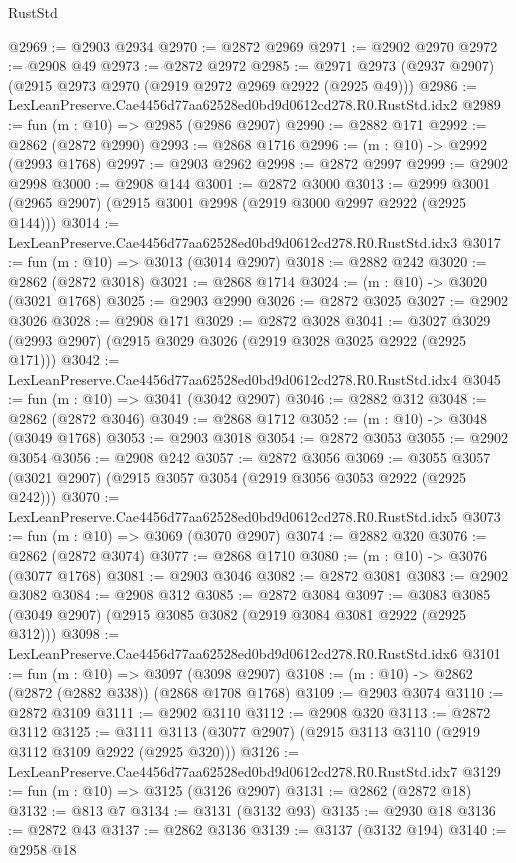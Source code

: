 \begin{lexlean}{RustStd}
\begin{coremodule}
@2969 := @2903 @2934
@2970 := @2872 @2969
@2971 := @2902 @2970
@2972 := @2908 @49
@2973 := @2872 @2972
@2985 := @2971 @2973 (@2937 @2907) (@2915 @2973 @2970 (@2919 @2972 @2969 @2922 (@2925 @49)))
@2986 := LexLeanPreserve.Cae4456d77aa62528ed0bd9d0612cd278.R0.RustStd.idx2
@2989 := fun (m : @10) => @2985 (@2986 @2907)
@2990 := @2882 @171
@2992 := @2862 (@2872 @2990)
@2993 := @2868 @1716
@2996 := (m : @10) -> @2992 (@2993 @1768)
@2997 := @2903 @2962
@2998 := @2872 @2997
@2999 := @2902 @2998
@3000 := @2908 @144
@3001 := @2872 @3000
@3013 := @2999 @3001 (@2965 @2907) (@2915 @3001 @2998 (@2919 @3000 @2997 @2922 (@2925 @144)))
@3014 := LexLeanPreserve.Cae4456d77aa62528ed0bd9d0612cd278.R0.RustStd.idx3
@3017 := fun (m : @10) => @3013 (@3014 @2907)
@3018 := @2882 @242
@3020 := @2862 (@2872 @3018)
@3021 := @2868 @1714
@3024 := (m : @10) -> @3020 (@3021 @1768)
@3025 := @2903 @2990
@3026 := @2872 @3025
@3027 := @2902 @3026
@3028 := @2908 @171
@3029 := @2872 @3028
@3041 := @3027 @3029 (@2993 @2907) (@2915 @3029 @3026 (@2919 @3028 @3025 @2922 (@2925 @171)))
@3042 := LexLeanPreserve.Cae4456d77aa62528ed0bd9d0612cd278.R0.RustStd.idx4
@3045 := fun (m : @10) => @3041 (@3042 @2907)
@3046 := @2882 @312
@3048 := @2862 (@2872 @3046)
@3049 := @2868 @1712
@3052 := (m : @10) -> @3048 (@3049 @1768)
@3053 := @2903 @3018
@3054 := @2872 @3053
@3055 := @2902 @3054
@3056 := @2908 @242
@3057 := @2872 @3056
@3069 := @3055 @3057 (@3021 @2907) (@2915 @3057 @3054 (@2919 @3056 @3053 @2922 (@2925 @242)))
@3070 := LexLeanPreserve.Cae4456d77aa62528ed0bd9d0612cd278.R0.RustStd.idx5
@3073 := fun (m : @10) => @3069 (@3070 @2907)
@3074 := @2882 @320
@3076 := @2862 (@2872 @3074)
@3077 := @2868 @1710
@3080 := (m : @10) -> @3076 (@3077 @1768)
@3081 := @2903 @3046
@3082 := @2872 @3081
@3083 := @2902 @3082
@3084 := @2908 @312
@3085 := @2872 @3084
@3097 := @3083 @3085 (@3049 @2907) (@2915 @3085 @3082 (@2919 @3084 @3081 @2922 (@2925 @312)))
@3098 := LexLeanPreserve.Cae4456d77aa62528ed0bd9d0612cd278.R0.RustStd.idx6
@3101 := fun (m : @10) => @3097 (@3098 @2907)
@3108 := (m : @10) -> @2862 (@2872 (@2882 @338)) (@2868 @1708 @1768)
@3109 := @2903 @3074
@3110 := @2872 @3109
@3111 := @2902 @3110
@3112 := @2908 @320
@3113 := @2872 @3112
@3125 := @3111 @3113 (@3077 @2907) (@2915 @3113 @3110 (@2919 @3112 @3109 @2922 (@2925 @320)))
@3126 := LexLeanPreserve.Cae4456d77aa62528ed0bd9d0612cd278.R0.RustStd.idx7
@3129 := fun (m : @10) => @3125 (@3126 @2907)
@3131 := @2862 (@2872 @18)
@3132 := @813 @7
@3134 := @3131 (@3132 @93)
@3135 := @2930 @18
@3136 := @2872 @43
@3137 := @2862 @3136
@3139 := @3137 (@3132 @194)
@3140 := @2958 @18

\end{coremodule}
\end{lexlean}
